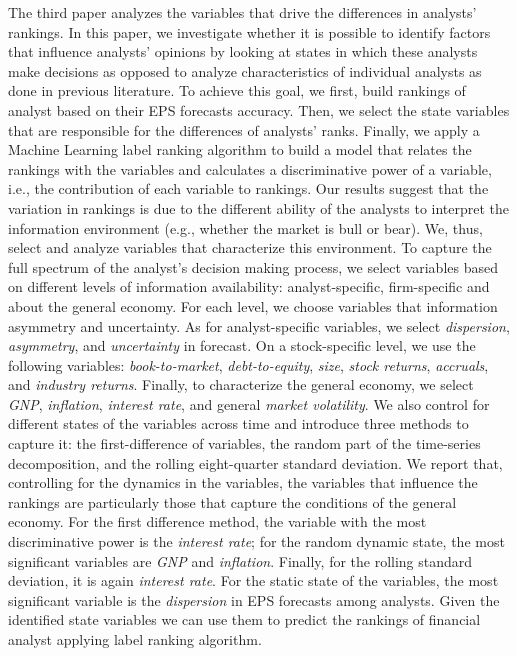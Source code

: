 The third paper analyzes  the variables that drive the differences in analysts’ rankings. In this paper, we investigate whether it is possible to identify factors that influence analysts’ opinions by looking at states in which these analysts make decisions as opposed to analyze characteristics of individual analysts as done in previous literature. To achieve this goal, we first, build rankings of analyst based on their EPS forecasts accuracy. Then, we select the state variables that are responsible for the  differences of analysts’ ranks. Finally, we apply a Machine Learning label ranking algorithm to build a model that relates the rankings with the variables and calculates a discriminative power of a variable, i.e., the contribution of each variable to rankings. Our results suggest that the variation in rankings is due to the different ability of the analysts to interpret the information environment (e.g., whether the market is bull or bear). We, thus, select and analyze variables that characterize this environment. To capture the full spectrum of the analyst’s decision making process, we select variables based on different levels of information availability: analyst-specific, firm-specific and about the  general economy. For each level, we choose variables  that  information asymmetry and uncertainty. As for analyst-specific variables, we select \emph{dispersion}, \emph{asymmetry}, and \emph{uncertainty} in forecast. On a stock-specific level, we use the following variables: \emph{book-to-market}, \emph{debt-to-equity}, \emph{size}, \emph{stock returns}, \emph{accruals}, and \emph{industry returns}. Finally, to characterize the general economy, we select \emph{GNP}, \emph{inflation}, \emph{interest rate}, and general \emph{market volatility}. We also control for different states of the variables across time and introduce three methods to capture it: the first-difference of variables, the random part of the time-series decomposition, and the rolling eight-quarter standard deviation. We report that, controlling for the dynamics in the variables, the variables that influence the rankings are particularly those that capture the conditions of  the general economy. For the first difference method, the variable with the most discriminative power is the \emph{interest rate}; for the random dynamic state, the most significant variables are \emph{GNP} and \emph{inflation}. Finally, for the rolling standard deviation, it is again \emph{interest rate}. For the static state of the variables, the most significant variable is the \emph{dispersion} in EPS  forecasts  among analysts. Given the identified state variables we can use them to predict the rankings of financial analyst applying label ranking algorithm. 

